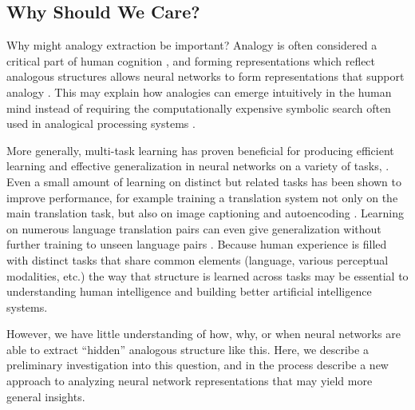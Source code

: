 \documentclass[10pt,letterpaper]{article}
\begin{document}
\subsection{Why Should We Care?}
Why might analogy extraction be important? Analogy is often considered a critical part of human cognition \cite[e.g.]{Gentner2003}, and forming representations which reflect analogous structures allows neural networks to form representations that support analogy \citep{Pennington2014,Kollias2013}. This may explain how analogies can emerge intuitively in the human mind instead of requiring the computationally expensive symbolic search often used in analogical processing systems \cite[e.g.]{Falkenhainer1989}. \par
More generally, multi-task learning has proven beneficial for producing efficient learning and effective generalization in neural networks on a variety of tasks, \cite[e.g.]{Dong2015,Rusu2015}. Even a small amount of learning on distinct but related tasks has been shown to improve performance, for example training a translation system not only on the main translation task, but also on image captioning and autoencoding \citep{Luong2016}. Learning on numerous language translation pairs can even give generalization without further training to unseen language pairs \citep{Johnson2016}. Because human experience is filled with distinct tasks that share common elements (language, various perceptual modalities, etc.) the way that structure is learned across tasks may be essential to understanding human intelligence and building better artificial intelligence systems.\par
However, we have little understanding of how, why, or when neural networks are able to extract ``hidden'' analogous structure like this. Here, we describe a preliminary investigation into this question, and in the process describe a new approach to analyzing neural network representations that may yield more general insights. 
\end{document}
